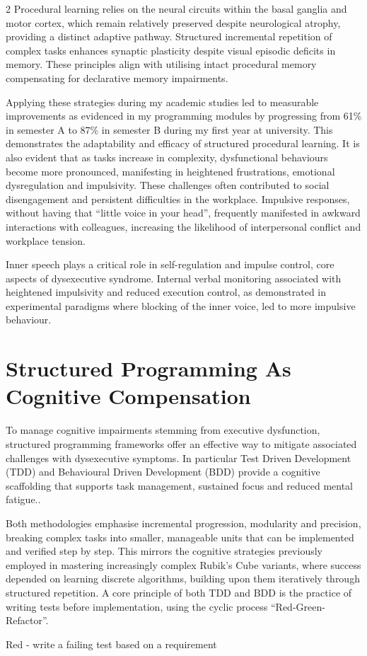 \documentclass{article}
\begin{document}


\begin{multicols}{2}
Procedural learning relies on the neural circuits within the basal ganglia and motor cortex, which remain relatively preserved despite neurological atrophy, providing a distinct adaptive pathway.\cite{doyon2005,peterson2016} Structured incremental repetition of complex tasks enhances synaptic plasticity despite visual episodic deficits in memory.\cite{kandel2014} These principles align with utilising intact procedural memory compensating for declarative memory impairments.\cite{squire2004,vakil2005}

Applying these strategies during my academic studies led to measurable improvements as evidenced in my programming modules by progressing from 61\% in semester A to 87\% in semester B during my first year at university. This demonstrates the adaptability and efficacy of structured procedural learning. It is also evident that as tasks increase in complexity, dysfunctional behaviours become more pronounced, manifesting in heightened frustrations, emotional dysregulation and impulsivity. These challenges often contributed to social disengagement and persistent difficulties in the workplace. Impulsive responses, without having that “little voice in your head”, frequently manifested in awkward interactions with colleagues, increasing the likelihood of interpersonal conflict and workplace tension.

Inner speech plays a critical role in self-regulation and impulse control, core aspects of dysexecutive syndrome. Internal verbal monitoring associated with heightened impulsivity and reduced execution control, as demonstrated in experimental paradigms where blocking of the inner voice, led to more impulsive behaviour.\cite{tullett2010}

\section*{Structured Programming As Cognitive Compensation}
To manage cognitive impairments stemming from executive dysfunction, structured programming frameworks offer an effective way to mitigate associated challenges with dysexecutive symptoms. In particular Test Driven Development (TDD) and Behavioural Driven Development (BDD) provide a cognitive scaffolding that supports task management, sustained focus and reduced mental fatigue.\cite{beck2003,janzen2005}.

Both methodologies emphasise incremental progression, modularity and precision, breaking complex tasks into smaller, manageable units that can be implemented and verified step by step. This mirrors the cognitive strategies previously employed in mastering increasingly complex Rubik’s Cube variants, where success depended on learning discrete algorithms, building upon them iteratively through structured repetition. A core principle of both TDD and BDD is the practice of writing tests before implementation, using the cyclic process “Red-Green-Refactor”.\cite{beck2003}
\\ 
\par
Red - write a failing test based on a requirement


\end{multicols}
\end{document}
